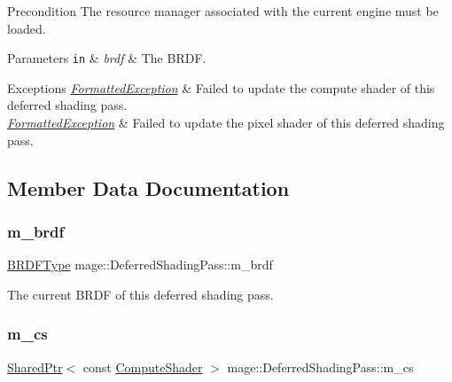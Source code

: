\begin{DoxyPrecond}{Precondition}
The resource manager associated with the current engine must be loaded. 
\end{DoxyPrecond}

\begin{DoxyParams}[1]{Parameters}
\mbox{\tt in}  & {\em brdf} & The B\+R\+DF. \\
\hline
\end{DoxyParams}

\begin{DoxyExceptions}{Exceptions}
{\em \hyperlink{classmage_1_1_formatted_exception}{Formatted\+Exception}} & Failed to update the compute shader of this deferred shading pass. \\
\hline
{\em \hyperlink{classmage_1_1_formatted_exception}{Formatted\+Exception}} & Failed to update the pixel shader of this deferred shading pass. \\
\hline
\end{DoxyExceptions}


\subsection{Member Data Documentation}
\hypertarget{classmage_1_1_deferred_shading_pass_a5a466f5c2ee71563f4f8ed6d042ee4b3}{}\label{classmage_1_1_deferred_shading_pass_a5a466f5c2ee71563f4f8ed6d042ee4b3} 
\subsubsection{\texorpdfstring{m\+\_\+brdf}{m\_brdf}}
{\footnotesize\ttfamily \hyperlink{namespacemage_ae7a7a03a7b34d7e2689689bb8295cd38}{B\+R\+D\+F\+Type} mage\+::\+Deferred\+Shading\+Pass\+::m\+\_\+brdf\hspace{0.3cm}{\ttfamily [private]}}

The current B\+R\+DF of this deferred shading pass. \hypertarget{classmage_1_1_deferred_shading_pass_a8d3bebdc41d116eb05d9f5a3c923f349}{}\label{classmage_1_1_deferred_shading_pass_a8d3bebdc41d116eb05d9f5a3c923f349} 
\subsubsection{\texorpdfstring{m\+\_\+cs}{m\_cs}}
{\footnotesize\ttfamily \hyperlink{namespacemage_a1e01ae66713838a7a67d30e44c67703e}{Shared\+Ptr}$<$ const \hyperlink{namespacemage_ae040329401484b076f0cd1a7c43d19c9}{Compute\+Shader} $>$ mage\+::\+Deferred\+Shading\+Pass\+::m\+\_\+cs\hspace{0.3cm}{\ttfamily [private]}}

